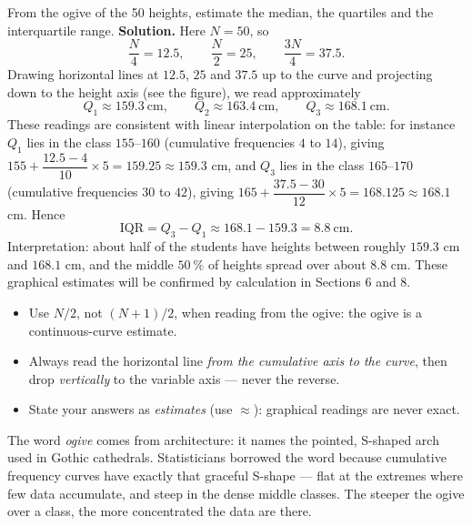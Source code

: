 \documentclass[11pt]{article}
\begin{document}
\begin{exoresolu}
From the ogive of the 50 heights, estimate the median, the quartiles and the interquartile range.
\tcblower
\textbf{Solution.} Here $N = 50$, so
\[
\frac{N}{4} = 12.5, \qquad \frac{N}{2} = 25, \qquad \frac{3N}{4} = 37.5.
\]
Drawing horizontal lines at $12.5$, $25$ and $37.5$ up to the curve and projecting down to the height axis (see the figure), we read approximately
\[
Q_1 \approx 159.3\ \text{cm}, \qquad Q_2 \approx 163.4\ \text{cm}, \qquad Q_3 \approx 168.1\ \text{cm}.
\]
These readings are consistent with linear interpolation on the table: for instance $Q_1$ lies in the class $155$--$160$ (cumulative frequencies $4$ to $14$), giving $155 + \dfrac{12.5-4}{10}\times 5 = 159.25 \approx 159.3$ cm, and $Q_3$ lies in the class $165$--$170$ (cumulative frequencies $30$ to $42$), giving $165 + \dfrac{37.5-30}{12}\times 5 = 168.125 \approx 168.1$ cm. Hence
\[
\mathrm{IQR} = Q_3 - Q_1 \approx 168.1 - 159.3 = 8.8\ \text{cm}.
\]
Interpretation: about half of the students have heights between roughly $159.3$ cm and $168.1$ cm, and the middle $50\ \%$ of heights spread over about $8.8$ cm. These graphical estimates will be confirmed by calculation in Sections 6 and 8.
\end{exoresolu}

\begin{attention}
\begin{itemize}
\item Use $N/2$, not $(N+1)/2$, when reading from the ogive: the ogive is a continuous-curve estimate.
\item Always read the horizontal line \emph{from the cumulative axis to the curve}, then drop \emph{vertically} to the variable axis — never the reverse.
\item State your answers as \emph{estimates} (use $\approx$): graphical readings are never exact.
\end{itemize}
\end{attention}

\begin{savaistu}
The word \emph{ogive} comes from architecture: it names the pointed, S-shaped arch used in Gothic cathedrals. Statisticians borrowed the word because cumulative frequency curves have exactly that graceful S-shape — flat at the extremes where few data accumulate, and steep in the dense middle classes. The steeper the ogive over a class, the more concentrated the data are there.
\end{savaistu}
\end{document}
